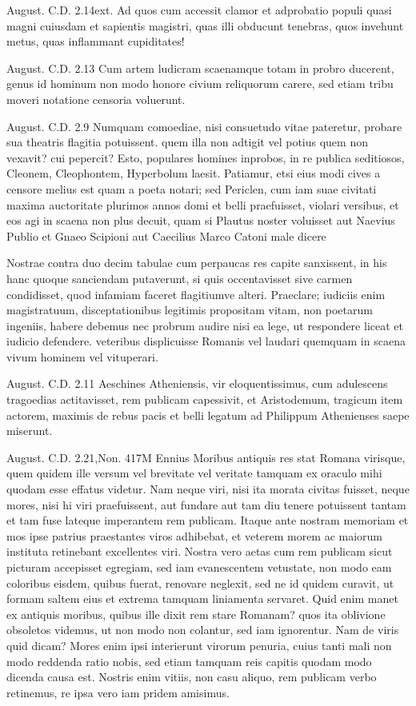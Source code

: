  August. C.D. 2.14ext. Ad quos cum accessit clamor et adprobatio populi quasi magni cuiusdam et sapientis magistri, quas illi obducunt tenebras, quos invehunt metus, quas inflammant cupiditates!

 August. C.D. 2.13 Cum artem ludicram scaenamque totam in probro ducerent, genus id hominum non modo honore civium reliquorum carere, sed etiam tribu moveri notatione censoria voluerunt.

 August. C.D. 2.9 Numquam comoediae, nisi consuetudo vitae pateretur, probare sua theatris flagitia potuissent. quem illa non adtigit vel potius quem non vexavit? cui pepercit? Esto, populares homines inprobos, in re publica seditiosos, Cleonem, Cleophontem, Hyperbolum laesit. Patiamur, etsi eius modi cives a censore melius est quam a poeta notari; sed Periclen, cum iam suae civitati maxima auctoritate plurimos annos domi et belli praefuisset, violari versibus, et eos agi in scaena non plus decuit, quam si Plautus noster voluisset aut Naevius Publio et Gnaeo Scipioni aut Caecilius Marco Catoni male dicere

 Nostrae contra duo decim tabulae cum perpaucas res capite sanxissent, in his hanc quoque sanciendam putaverunt, si quis occentavisset sive carmen condidisset, quod infamiam faceret flagitiumve alteri. Praeclare; iudiciis enim magistratuum, disceptationibus legitimis propositam vitam, non poetarum ingeniis, habere debemus nec probrum audire nisi ea lege, ut respondere liceat et iudicio defendere. veteribus displicuisse Romanis vel laudari quemquam in scaena vivum hominem vel vituperari.

 August. C.D. 2.11 Aeschines Atheniensis, vir eloquentissimus, cum adulescens tragoedias actitavisset, rem publicam capessivit, et Aristodemum, tragicum item actorem, maximis de rebus pacis et belli legatum ad Philippum Athenienses saepe miserunt.

 August. C.D. 2.21,Non. 417M Ennius Moribus antiquis res stat Romana virisque, quem quidem ille versum vel brevitate vel veritate tamquam ex oraculo mihi quodam esse effatus videtur. Nam neque viri, nisi ita morata civitas fuisset, neque mores, nisi hi viri praefuissent, aut fundare aut tam diu tenere potuissent tantam et tam fuse lateque imperantem rem publicam. Itaque ante nostram memoriam et mos ipse patrius praestantes viros adhibebat, et veterem morem ac maiorum instituta retinebant excellentes viri. Nostra vero aetas cum rem publicam sicut picturam accepisset egregiam, sed iam evanescentem vetustate, non modo eam coloribus eisdem, quibus fuerat, renovare neglexit, sed ne id quidem curavit, ut formam saltem eius et extrema tamquam liniamenta servaret. Quid enim manet ex antiquis moribus, quibus ille dixit rem stare Romanam? quos ita oblivione obsoletos videmus, ut non modo non colantur, sed iam ignorentur. Nam de viris quid dicam? Mores enim ipsi interierunt virorum penuria, cuius tanti mali non modo reddenda ratio nobis, sed etiam tamquam reis capitis quodam modo dicenda causa est. Nostris enim vitiis, non casu aliquo, rem publicam verbo retinemus, re ipsa vero iam pridem amisimus.

